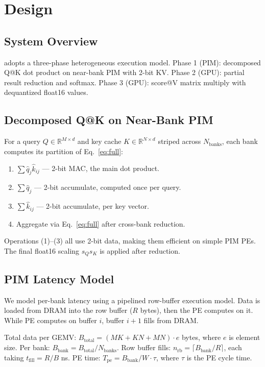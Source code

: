 \section{\pimattn{} Design}

\subsection{System Overview}

\pimattn{} adopts a three-phase heterogeneous execution model.
Phase 1 (PIM): decomposed Q@K dot product on near-bank PIM with 2-bit KV.
Phase 2 (GPU): partial result reduction and softmax.
Phase 3 (GPU): score@V matrix multiply with dequantized float16 values.

\subsection{Decomposed Q@K on Near-Bank PIM}

For a query $Q \in \mathbb{R}^{M \times d}$ and key cache $K \in \mathbb{R}^{N \times d}$ striped across $N_{\text{banks}}$, each bank computes its partition of Eq.~\ref{eq:full}:

\begin{enumerate}
\item $\sum \hat{q}_j \hat{k}_{ij}$ --- 2-bit MAC, the main dot product.
\item $\sum \hat{q}_j$ --- 2-bit accumulate, computed once per query.
\item $\sum \hat{k}_{ij}$ --- 2-bit accumulate, per key vector.
\item Aggregate via Eq.~\ref{eq:full} after cross-bank reduction.
\end{enumerate}

Operations (1)--(3) all use 2-bit data, making them efficient on simple PIM PEs.
The final float16 scaling $s_Q s_K$ is applied after reduction.

\subsection{PIM Latency Model}

We model per-bank latency using a pipelined row-buffer execution model.
Data is loaded from DRAM into the row buffer ($R$ bytes), then the PE computes on it.
While PE computes on buffer $i$, buffer $i+1$ fills from DRAM.

Total data per GEMV: $B_{\text{total}} = (MK + KN + MN) \cdot e$ bytes, where $e$ is element size.
Per bank: $B_{\text{bank}} = B_{\text{total}} / N_{\text{banks}}$.
Row buffer fills: $n_{\text{rb}} = \lceil B_{\text{bank}} / R \rceil$, each taking $t_{\text{fill}} = R / B$ ns.
PE time: $T_{\text{pe}} = B_{\text{bank}} / W \cdot \tau$, where $\tau$ is the PE cycle time.

